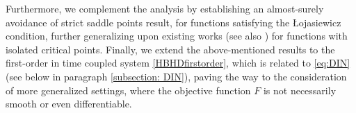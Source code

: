 \documentclass[reqno]{amsart}
\theoremstyle{plain}
\theoremstyle{definition}
\theoremstyle{remark}
\DeclarePairedDelimiter{\norm}{\lVert}{\rVert}	%
\begin{document}
Furthermore, we complement the analysis by establishing an almost-surely avoidance of strict saddle points result, for functions satisfying the \L ojasiewicz condition, further generalizing upon existing works \cite{castera2023inertial} (see also \cite{maulen2024inertial}) for functions with isolated critical points. 
Finally, we extend the above-mentioned results to the first-order in time coupled system \eqref{HBHDfirstorder}, which is related to \eqref{eq:DIN} (see below in paragraph \ref{subsection: DIN}), paving the way to the consideration of more generalized settings, where the objective function $F$ is not necessarily smooth or even differentiable.


\end{document}
